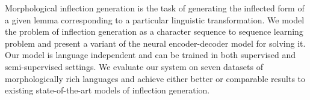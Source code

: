 Morphological inflection generation is the task of generating the inflected form of a given lemma corresponding to a particular linguistic transformation. We model the problem of inflection generation as a character sequence to sequence learning problem and present a variant of the neural encoder-decoder model for solving it. Our model is language independent and can be trained in both supervised and semi-supervised settings. We evaluate our system on seven datasets of morphologically rich languages and achieve either better or comparable results to existing state-of-the-art models of inflection generation.
